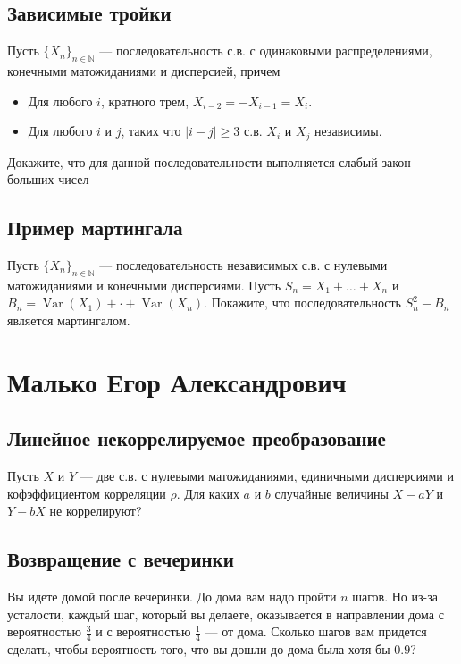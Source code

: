 \documentclass[12pt]{article}
\newcommand\N{\mathbb{N}}
\DeclareMathOperator{\Var}{Var}
\begin{document}
\subsection{Зависимые тройки}
Пусть $\{X_n\}_{n \in \N}$ --- последовательность с.в. с одинаковыми распределениями, конечными матожиданиями и дисперсией, причем
\begin{itemize}
    \item Для любого $i$, кратного трем, $X_{i - 2} = - X_{i - 1} = X_{i}$. 
    \item Для любого $i$ и $j$, таких что $|i - j| \ge 3$ с.в. $X_i$ и $X_j$ независимы.
\end{itemize}
Докажите, что для данной последовательности выполняется слабый закон больших чисел


\subsection{Пример мартингала}

Пусть $\{X_n\}_{n \in \N}$ --- последовательность независимых с.в. с нулевыми матожиданиями и конечными дисперсиями. Пусть $S_n = X_1 + \dots + X_n$ и $B_n = \Var(X_1) + \cdot + \Var(X_n)$. Покажите, что последовательность $S_n^2 - B_n$ является мартингалом.


\newpage
\section{Малько Егор Александрович}

\subsection{Линейное некоррелируемое преобразование}

Пусть $X$ и $Y$ --- две с.в. с нулевыми матожиданиями, единичными дисперсиями и кофэффициентом корреляции $\rho$. Для каких $a$ и $b$ случайные величины $X - aY$ и $Y - bX$ не коррелируют?


\subsection{Возвращение с вечеринки}

Вы идете домой после вечеринки. До дома вам надо пройти $n$ шагов. Но из-за усталости, каждый шаг, который вы делаете, оказывается в направлении дома с вероятностью $\frac{3}{4}$ и с вероятностью $\frac{1}{4}$ --- от дома. Сколько шагов вам придется сделать, чтобы вероятность того, что вы дошли до дома была хотя бы $0.9$?
\end{document}
